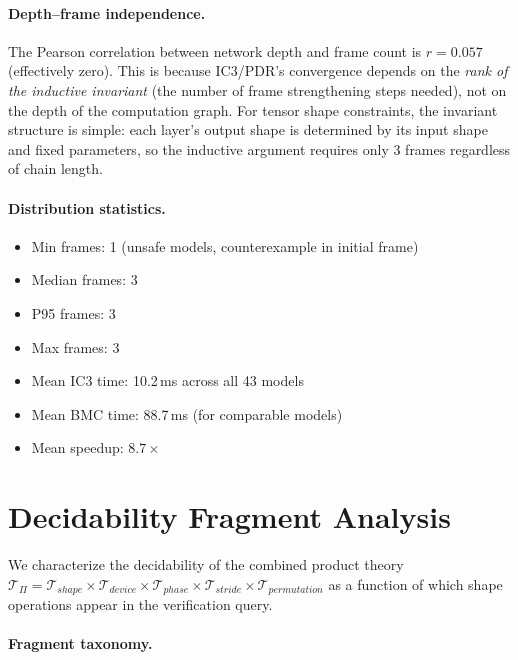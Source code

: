 \documentclass[11pt]{article}
\begin{document}
\paragraph{Depth--frame independence.}
The Pearson correlation between network depth and frame count is
$r = 0.057$ (effectively zero).  This is because IC3/PDR's
convergence depends on the \emph{rank of the inductive invariant}
(the number of frame strengthening steps needed), not on the
depth of the computation graph.  For tensor shape constraints, the
invariant structure is simple: each layer's output shape is
determined by its input shape and fixed parameters, so the
inductive argument requires only 3 frames regardless of chain length.

\paragraph{Distribution statistics.}
\begin{itemize}[leftmargin=2em,nosep]
  \item Min frames: 1 (unsafe models, counterexample in initial frame)
  \item Median frames: 3
  \item P95 frames: 3
  \item Max frames: 3
  \item Mean IC3 time: 10.2\,ms across all 43 models
  \item Mean BMC time: 88.7\,ms (for comparable models)
  \item Mean speedup: $8.7\times$
\end{itemize}


\section{Decidability Fragment Analysis}\label{app:decidability}

We characterize the decidability of the combined product theory
$\mathcal{T}_\Pi = \mathcal{T}_{\mathit{shape}} \times
\mathcal{T}_{\mathit{device}} \times \mathcal{T}_{\mathit{phase}}
\times \mathcal{T}_{\mathit{stride}} \times
\mathcal{T}_{\mathit{permutation}}$ as a function of which shape
operations appear in the verification query.

\paragraph{Fragment taxonomy.}
\end{document}
